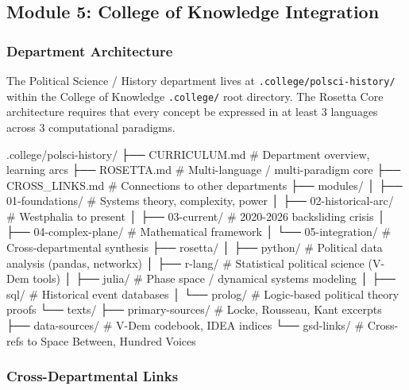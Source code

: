 \documentclass[11pt,letterpaper]{article}
\begin{document}
\subsection{Module 5: College of Knowledge Integration}

\subsubsection{Department Architecture}

The Political Science / History department lives at \texttt{.college/polsci-history/} within the College of Knowledge \texttt{.college/} root directory. The Rosetta Core architecture requires that every concept be expressed in at least 3 languages across 3 computational paradigms.

\begin{asciibox}
.college/polsci-history/
├── CURRICULUM.md          # Department overview, learning arcs
├── ROSETTA.md             # Multi-language / multi-paradigm core
├── CROSS_LINKS.md         # Connections to other departments
├── modules/
│   ├── 01-foundations/    # Systems theory, complexity, power
│   ├── 02-historical-arc/ # Westphalia to present
│   ├── 03-current/        # 2020-2026 backsliding crisis
│   ├── 04-complex-plane/  # Mathematical framework
│   └── 05-integration/    # Cross-departmental synthesis
├── rosetta/
│   ├── python/            # Political data analysis (pandas, networkx)
│   ├── r-lang/            # Statistical political science (V-Dem tools)
│   ├── julia/             # Phase space / dynamical systems modeling
│   ├── sql/               # Historical event databases
│   └── prolog/            # Logic-based political theory proofs
└── texts/
    ├── primary-sources/   # Locke, Rousseau, Kant excerpts
    ├── data-sources/      # V-Dem codebook, IDEA indices
    └── gsd-links/         # Cross-refs to Space Between, Hundred Voices
\end{asciibox}

\subsubsection{Cross-Departmental Links}
\end{document}
